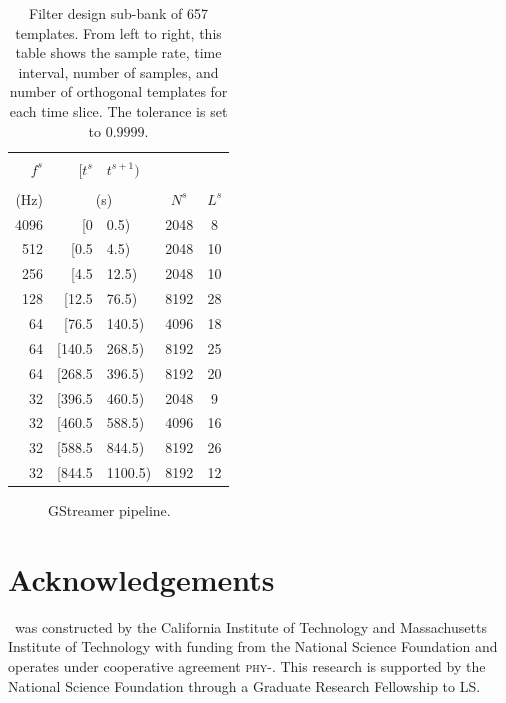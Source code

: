 \documentclass[portrait,plainboxedsections]{sciposter}
\begin{document}
\begin{minipage}[t]{0.25\textwidth}
\begin{table}
\begin{tabular}{rr@{,\,}lcc}
\toprule
\\ [-2ex]
$f^s$ & $[t^s$&$t^{s+1})$ & & \\%
\\[-2.5ex]
(Hz) & \multicolumn{2}{c}{(s)} & $N^s$ & $L^s$ \\ \midrule
4096 & [0&0.5) & 2048 & 8 \\
512 & [0.5&4.5) & 2048 & 10 \\
256 & [4.5&12.5) & 2048 & 10 \\
128 & [12.5&76.5) & 8192 & 28 \\
64 & [76.5&140.5) & 4096 & 18 \\
64 & [140.5&268.5) & 8192 & 25 \\
64 & [268.5&396.5) & 8192 & 20 \\
32 & [396.5&460.5) & 2048 & 9 \\
32 & [460.5&588.5) & 4096 & 16 \\
32 & [588.5&844.5) & 8192 & 26 \\
32 & [844.5&1100.5) & 8192 & 12 \\
\bottomrule
\end{tabular}
\caption{\label{tab:time_slices} Filter design sub-bank of 657 templates.  From left to right, this table shows the sample rate, time interval, number of samples, and number of orthogonal templates for each time slice.  The \SVD{} tolerance is set to $0.9999$.}
\end{table}


\begin{figure}
\centering
\caption{GStreamer pipeline.}
\label{f:gstreamer_pipeline}
\end{figure}

\end{minipage}

\section*{Acknowledgements}

\LIGO\ was constructed by the California Institute of Technology and
Massachusetts Institute of Technology with funding from the National Science
Foundation and operates under cooperative agreement
\textsc{phy}-. This research
is supported by the National Science Foundation through a Graduate Research
Fellowship to LS.




\end{document}
